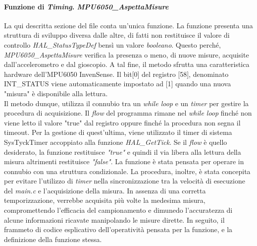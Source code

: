 \documentclass[11pt]{report}
\begin{document}
\paragraph{Funzione di \textit{Timing}. \textit{MPU6050\_AspettaMisure}}
La qui descritta sezione del file conta un'unica funzione. La funzione presenta una struttura di sviluppo diversa dalle altre, di fatti non restituisce il valore di controllo \textit{HAL\_StatusTypeDef} bensì un valore \textit{booleano}. Questo perché,
\textit{MPU6050\_AspettaMisure} verifica la presenza o meno, di nuove misure, acquisite dall'accelerometro e dal gioscopio. A tal fine, il metodo sfrutta una caratteristica hardware dell'MPU6050 InvenSense.
Il bit[0] del registro [58], denominato INT\_STATUS viene automaticamente impostato ad [1] quando una nuova "misura" è disponibile alla lettura.\\
Il metodo dunque, utilizza il connubio tra un \textit{while loop} e un \textit{timer} per gestire la procedura di acquisizione.
Il \textit{flow} del programma rimane nel \textit{while loop} finché non viene letto il valore "true" dal registro oppure finché la procedura non segna il timeout. Per la gestione di quest'ultima, viene utilizzato il timer di sistema SysTyckTimer accoppiato alla funzione \textit{HAL\_GetTick}.
Se il \textit{flow} è quello desiderato, la funzione restituisce \textit{"true"} e quindi il via libera alla lettura della misura altrimenti restituisce \textit{"false"}.
La funzione è stata pensata per operare in connubio con una struttura condizionale.
La procedura, inoltre, è stata concepita per evitare l'utilizzo di \textit{timer} nella sincronizzazione tra la velocità di esecuzione del \textit{main.c} e l'acquisizione della misura. In assenza di una corretta temporizzazione, verrebbe acquisita più volte la medesima misura, compromettendo l'efficacia del campionamento e dimunedo l'accuratezza di alcune informazioni ricavate manipolando le misure dirette.
In seguito, il frammeto di codice esplicativo dell'operatività pensata per la funzione, e la definizione della funzione stessa.

%
\end{document}
